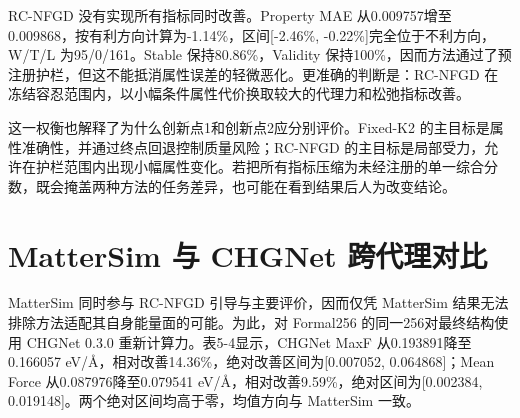 RC-NFGD 没有实现所有指标同时改善。Property MAE 从0.009757增至0.009868，按有利方向计算为-1.14\%，区间{[}-2.46\%, -0.22\%{]}完全位于不利方向，W/T/L 为95/0/161。Stable 保持80.86\%，Validity 保持100\%，因而方法通过了预注册护栏，但这不能抵消属性误差的轻微恶化。更准确的判断是：RC-NFGD 在冻结容忍范围内，以小幅条件属性代价换取较大的代理力和松弛指标改善。

这一权衡也解释了为什么创新点1和创新点2应分别评价。Fixed-K2 的主目标是属性准确性，并通过终点回退控制质量风险；RC-NFGD 的主目标是局部受力，允许在护栏范围内出现小幅属性变化。若把所有指标压缩为未经注册的单一综合分数，既会掩盖两种方法的任务差异，也可能在看到结果后人为改变结论。

\section{Matter\allowbreak Sim 与 CHGNet 跨代理对比}

Matter\allowbreak Sim 同时参与 RC-NFGD 引导与主要评价，因而仅凭 Matter\allowbreak Sim 结果无法排除方法适配其自身能量面的可能。为此，对 Formal256 的同一256对最终结构使用 CHGNet 0.3.0 重新计算力。表5-4显示，CHGNet MaxF 从0.193891降至0.166057 eV/Å，相对改善14.36\%，绝对改善区间为{[}0.007052, 0.064868{]}；Mean Force 从0.087976降至0.079541 eV/Å，相对改善9.59\%，绝对区间为{[}0.002384, 0.019148{]}。两个绝对区间均高于零，均值方向与 Matter\allowbreak Sim 一致。

\clearpage

